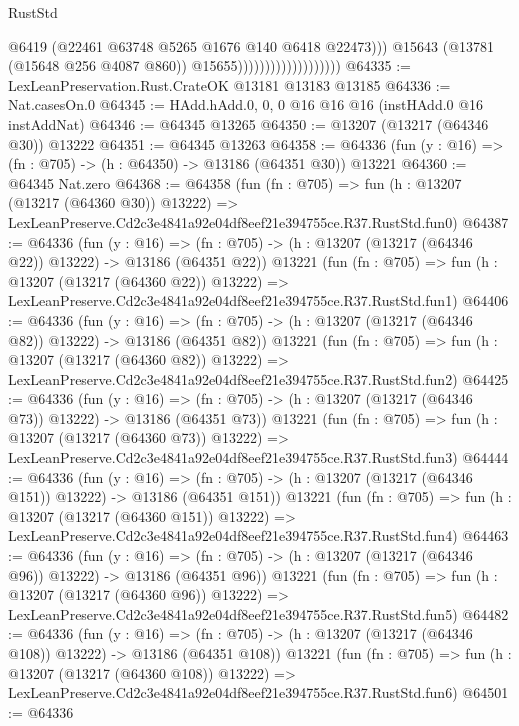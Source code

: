 \begin{lexlean}{RustStd}
\begin{coremodule}
                                              @6419
                                              (@22461 @63748 @5265 @1676 @140 @6418 @22473)))
                                          @15643
                                          (@13781 (@15648 @256 @4087 @860))
                                          @15655)))))))))))))))))))
@64335 := LexLeanPreservation.Rust.CrateOK @13181 @13183 @13185
@64336 := Nat.casesOn.{0}
@64345 := HAdd.hAdd.{0, 0, 0} @16 @16 @16 (instHAdd.{0} @16 instAddNat)
@64346 := @64345 @13265
@64350 := @13207 (@13217 (@64346 @30)) @13222
@64351 := @64345 @13263
@64358 := @64336 (fun (y : @16) => (fn : @705) -> (h : @64350) -> @13186 (@64351 @30)) @13221
@64360 := @64345 Nat.zero
@64368 := @64358
    (fun (fn : @705) =>
    fun (h : @13207 (@13217 (@64360 @30)) @13222) =>
    LexLeanPreserve.Cd2c3e4841a92e04df8eef21e394755ce.R37.RustStd.fun0)
@64387 := @64336
    (fun (y : @16) =>
    (fn : @705) -> (h : @13207 (@13217 (@64346 @22)) @13222) -> @13186 (@64351 @22))
    @13221
    (fun (fn : @705) =>
    fun (h : @13207 (@13217 (@64360 @22)) @13222) =>
    LexLeanPreserve.Cd2c3e4841a92e04df8eef21e394755ce.R37.RustStd.fun1)
@64406 := @64336
    (fun (y : @16) =>
    (fn : @705) -> (h : @13207 (@13217 (@64346 @82)) @13222) -> @13186 (@64351 @82))
    @13221
    (fun (fn : @705) =>
    fun (h : @13207 (@13217 (@64360 @82)) @13222) =>
    LexLeanPreserve.Cd2c3e4841a92e04df8eef21e394755ce.R37.RustStd.fun2)
@64425 := @64336
    (fun (y : @16) =>
    (fn : @705) -> (h : @13207 (@13217 (@64346 @73)) @13222) -> @13186 (@64351 @73))
    @13221
    (fun (fn : @705) =>
    fun (h : @13207 (@13217 (@64360 @73)) @13222) =>
    LexLeanPreserve.Cd2c3e4841a92e04df8eef21e394755ce.R37.RustStd.fun3)
@64444 := @64336
    (fun (y : @16) =>
    (fn : @705) -> (h : @13207 (@13217 (@64346 @151)) @13222) -> @13186 (@64351 @151))
    @13221
    (fun (fn : @705) =>
    fun (h : @13207 (@13217 (@64360 @151)) @13222) =>
    LexLeanPreserve.Cd2c3e4841a92e04df8eef21e394755ce.R37.RustStd.fun4)
@64463 := @64336
    (fun (y : @16) =>
    (fn : @705) -> (h : @13207 (@13217 (@64346 @96)) @13222) -> @13186 (@64351 @96))
    @13221
    (fun (fn : @705) =>
    fun (h : @13207 (@13217 (@64360 @96)) @13222) =>
    LexLeanPreserve.Cd2c3e4841a92e04df8eef21e394755ce.R37.RustStd.fun5)
@64482 := @64336
    (fun (y : @16) =>
    (fn : @705) -> (h : @13207 (@13217 (@64346 @108)) @13222) -> @13186 (@64351 @108))
    @13221
    (fun (fn : @705) =>
    fun (h : @13207 (@13217 (@64360 @108)) @13222) =>
    LexLeanPreserve.Cd2c3e4841a92e04df8eef21e394755ce.R37.RustStd.fun6)
@64501 := @64336

\end{coremodule}
\end{lexlean}
